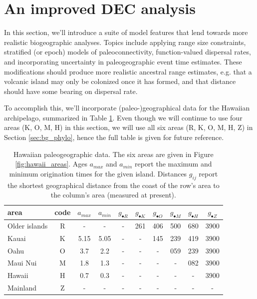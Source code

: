 

\section{An improved DEC analysis} \label{sec:bg_epoch}

In this section, we'll introduce a suite of model features that lend towards more realistic biogeographic analyses.
Topics include applying range size constraints, stratified (or epoch) models of paleoconnectivity, function-valued dispersal rates, and incorporating uncertainty in paleogeographic event time estimates.
These modifications should produce more realistic ancestral range estimates, e.g. that a volcanic island may only be colonized once it has formed, and that distance should have some bearing on dispersal rate.

To accomplish this, we'll incorporate (paleo-)geographical data for the Hawaiian archipelago, summarized in Table \ref{tab:paleogeo}.
Even though we will continue to use four areas (K, O, M, H) in this section, we will use all six areas (R, K, O, M, H, Z) in Section \ref{sec:bg_phylo}, hence the full table is given for future reference.

\begin{table}[!h]
\centering
\begin{tabular}{l|c|cc|cccccc}
area & code & $a_{max}$ & $a_{min}$ & $g_{\bullet R}$ & $g_{\bullet K}$ & $g_{\bullet O}$ & $g_{\bullet M}$ & $g_{\bullet H}$  & $g_{\bullet Z}$ \\ \hline
Older islands & R & - & - & - & 261 & 406 & 500 & 680 & 3900 \\
Kauai & K & 5.15 & 5.05 & - & - & 145 & 239 & 419 & 3900 \\
Oahu & O & 3.7  & 2.2  & - & -  & -  & 059 & 239 & 3900 \\
Maui Nui & M & 1.8  & 1.3  & - & -  & -  & -  & 082 & 3900 \\
Hawaii & H & 0.7  & 0.3  & - & -  & -  & -  & - & 3900 \\
Mainland & Z & - & - & - & - & - & - & - & - \\
\end{tabular}
\caption{Hawaiian paleogeographic data.
The six areas are given in Figure \ref{fig:hawaii_areas}.
Ages $a_{max}$ and $a_{min}$ report the maximum and minimum origination times for the given island.
Distances $g_{ij}$ report the shortest geographical distance from the coast of the row's area to the column's area (measured at present).}
\label{tab:paleogeo}
\end{table}

